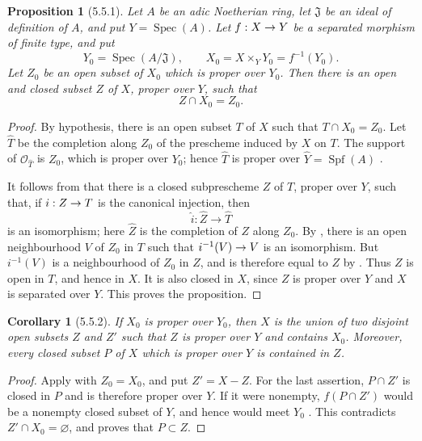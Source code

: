 \documentclass[oneside]{amsart}
\theoremstyle{ega-env-style}
\theoremstyle{ega-thm-env-style}
\newtheorem*{proposition}{Proposition}
\newtheorem*{corollary}{Corollary}
\theoremstyle{ega-defn-env-style}
\def\mathcal{\mathscr}
\def\sh{\mathcal}                   %
\def\Spec{\operatorname{Spec}}
\def\Spf{\operatorname{Spf}}
\renewcommand{\to}{\mathchoice{\longrightarrow}{\rightarrow}{\rightarrow}{\rightarrow}}
\let\EGAOriginalLabel\label
\renewcommand{\label}[1]{\phantomsection\EGAOriginalLabel{#1}}
\begin{document}
\begin{proposition}[5.5.1]
\label{III.5.5.1}
Let $A$ be an adic Noetherian ring, let $\mathfrak{J}$ be an ideal
of definition of $A$, and put $Y=\Spec(A)$.  Let $f:X\to Y$ be a
separated morphism of finite type, and put
\[
  Y_0=\Spec(A/\mathfrak{J}),\qquad
  X_0=X\times_Y Y_0=f^{-1}(Y_0).
\]
Let $Z_0$ be an open subset of $X_0$ which is proper over $Y_0$.
Then there is an open and closed subset $Z$ of $X$, proper over
$Y$, such that
\[
  Z\cap X_0=Z_0.
\]
\end{proposition}

\begin{proof}
By hypothesis, there is an open subset $T$ of $X$ such that
$T\cap X_0=Z_0$.  Let $\widehat{T}$ be the completion along $Z_0$
of the prescheme induced by $X$ on $T$.  The support of
$\sh{O}_{\widehat{T}}$ is $Z_0$, which is proper over $Y_0$;
hence $\widehat{T}$ is proper over
$\widehat{Y}=\Spf(A)$ .

It follows from  that there is a closed
subprescheme $Z$ of $T$, proper over $Y$, such that, if
$i:Z\to T$ is the canonical injection, then
\[
  \widehat{i}:\widehat{Z}\longrightarrow\widehat{T}
\]
is an isomorphism; here $\widehat{Z}$ is the completion of $Z$
along $Z_0$.  By , there is an open neighbourhood
$V$ of $Z_0$ in $T$ such that
$i^{-1}(V)\to V$ is an isomorphism.  But $i^{-1}(V)$ is a
neighbourhood of $Z_0$ in $Z$, and is therefore equal to $Z$ by
.  Thus $Z$ is open in $T$, and hence in $X$.
It is also closed in $X$, since $Z$ is proper over $Y$ and $X$ is
separated over $Y$.  This proves the proposition.
\end{proof}

\begin{corollary}[5.5.2]
\label{III.5.5.2}
If $X_0$ is proper over $Y_0$, then $X$ is the union of two
disjoint open subsets $Z$ and $Z'$ such that $Z$ is proper over
$Y$ and contains $X_0$.  Moreover, every closed subset $P$ of $X$
which is proper over $Y$ is contained in $Z$.
\end{corollary}

\begin{proof}
Apply  with $Z_0=X_0$, and put $Z'=X-Z$.  For the
last assertion, $P\cap Z'$ is closed in $P$ and is therefore proper
over $Y$.  If it were nonempty, $f(P\cap Z')$ would be a nonempty
closed subset of $Y$, and hence would meet $Y_0$
.  This contradicts
$Z'\cap X_0=\varnothing$, and proves that $P\subset Z$.
\end{proof}
\end{document}
